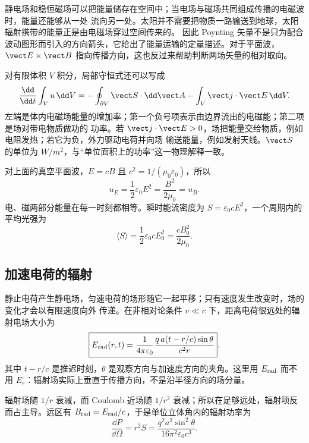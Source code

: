 静电场和稳恒磁场可以把能量储存在空间中；当电场与磁场共同组成传播的电磁波时，能量还能够从一处
流向另一处。太阳并不需要把物质一路输送到地球，太阳辐射携带的能量正是由电磁场穿过空间传来的。
因此 Poynting 矢量不是只为配合波动图形而引入的方向箭头，它给出了能量运输的定量描述。对于平面波，
$\vect E\times\vect B$ 指向传播方向，这也反过来帮助判断两场矢量的相对取向。

对有限体积 $V$ 积分，局部守恒式还可以写成
\begin{equation}
  \frac{\dd}{\dd t}\int_Vu\,\dd V
  =-\oint_{\partial V}\vect S\cdot\dd\vect A-
  \int_V\vect j\cdot\vect E\,\dd V.
\end{equation}
左端是体内电磁场能量的增加率；第一个负号项表示由边界流出的电磁能；第二项是场对带电物质做功的
功率。若 $\vect j\cdot\vect E>0$，场把能量交给物质，例如电阻发热；若它为负，外力驱动电荷并向场
输送能量，例如发射天线。$\vect S$ 的单位为 $\si{W/m^2}$，与“单位面积上的功率”这一物理解释一致。

\poyntingBalanceDiagram

对上面的真空平面波，$E=cB$ 且 $c^2=1/(\mu_0\varepsilon_0)$，所以
\begin{equation}
  u_E=\frac12\varepsilon_0E^2
  =\frac{B^2}{2\mu_0}=u_B.
\end{equation}
电、磁两部分能量在每一时刻都相等。瞬时能流密度为 $S=\varepsilon_0cE^2$，一个周期内的平均光强为
\begin{equation}
  \boxed{\langle S\rangle=\frac12\varepsilon_0cE_0^2
  =\frac{cB_0^2}{2\mu_0}}.
\end{equation}

\subsection*{加速电荷的辐射}

静止电荷产生静电场，匀速电荷的场形随它一起平移；只有速度发生改变时，场的变化才会以有限速度向外
传递。在非相对论条件 $v\ll c$ 下，距离电荷很远处的辐射电场大小为
\begin{equation}
  \boxed{E_{\rm rad}(r,t)=\frac{1}{4\pi\varepsilon_0}
  \frac{q\,a(t-r/c)\sin\theta}{c^2r}}.
\end{equation}
其中 $t-r/c$ 是推迟时刻，$\theta$ 是观察方向与加速度方向的夹角。这里用 $E_{\rm rad}$ 而不用
$E_r$：辐射场实际上垂直于传播方向，不是沿半径方向的场分量。

辐射场随 $1/r$ 衰减，而 Coulomb 近场随 $1/r^2$ 衰减；所以在足够远处，辐射项反而占主导。远区有
$B_{\rm rad}=E_{\rm rad}/c$，于是单位立体角内的辐射功率为
\begin{equation}
  \frac{\dd P}{\dd\Omega}=r^2S
  =\frac{q^2a^2\sin^2\theta}{16\pi^2\varepsilon_0c^3}.
\end{equation}

